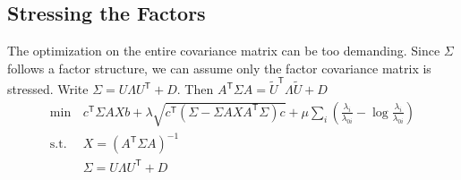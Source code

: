 \documentclass[letter, 12pt]{article}
\newcommand{\transpose}{^\mathsf{T}}
\newcommand{\suchthat}{\text{s.t.}}
\newcommand{\inv}{^{-1}}
\begin{document}
\subsection{Stressing the Factors}
The optimization on the entire covariance matrix can be too demanding. Since $\Sigma$ follows a factor structure, we can assume only the factor covariance matrix is stressed. Write $\Sigma = U\Lambda U\transpose + D$. Then $A\transpose \Sigma A = \tilde U\transpose \Lambda \tilde U + D$
\begin{align*}
\min \, & c\transpose \Sigma A X b + \lambda \sqrt{ c\transpose ( \Sigma - \Sigma A X A\transpose \Sigma ) c} +\mu \sum_i \left(\frac{\lambda_i}{\lambda_{0i}} -\log \frac{\lambda_i}{\lambda_{0i}} \right) \\
\suchthat \, & X = (A\transpose \Sigma A) \inv\\
& \Sigma = U\Lambda U\transpose + D
\end{align*}


\end{document}
